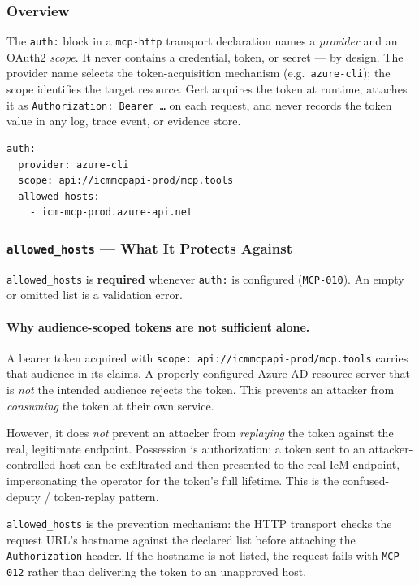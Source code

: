 \subsubsection{Overview}

The \texttt{auth:} block in a \texttt{mcp-http} transport declaration names a
\emph{provider} and an OAuth2 \emph{scope}.  It never contains a credential,
token, or secret --- by design.  The provider name selects the token-acquisition
mechanism (e.g.\ \texttt{azure-cli}); the scope identifies the target resource.
Gert acquires the token at runtime, attaches it as
\texttt{Authorization: Bearer \ldots} on each request, and never records the
token value in any log, trace event, or evidence store.

\begin{verbatim}
auth:
  provider: azure-cli
  scope: api://icmmcpapi-prod/mcp.tools
  allowed_hosts:
    - icm-mcp-prod.azure-api.net
\end{verbatim}

\subsubsection{\texttt{allowed\_hosts} --- What It Protects Against}
\label{sec:mcp-http-allowed-hosts}

\texttt{allowed\_hosts} is \textbf{required} whenever \texttt{auth:} is
configured (\texttt{MCP-010}).  An empty or omitted list is a validation
error.

\paragraph{Why audience-scoped tokens are not sufficient alone.}
A bearer token acquired with \texttt{scope: api://icmmcpapi-prod/mcp.tools}
carries that audience in its claims.  A properly configured Azure AD resource
server that is \emph{not} the intended audience rejects the token.  This
prevents an attacker from \emph{consuming} the token at their own service.

However, it does \emph{not} prevent an attacker from \emph{replaying} the token
against the real, legitimate endpoint.  Possession is authorization: a token
sent to an attacker-controlled host can be exfiltrated and then presented to
the real IcM endpoint, impersonating the operator for the token's full
lifetime.  This is the confused-deputy / token-replay pattern.

\texttt{allowed\_hosts} is the prevention mechanism: the HTTP transport checks
the request URL's hostname against the declared list before attaching the
\texttt{Authorization} header.  If the hostname is not listed, the request
fails with \texttt{MCP-012} rather than delivering the token to an unapproved
host.

